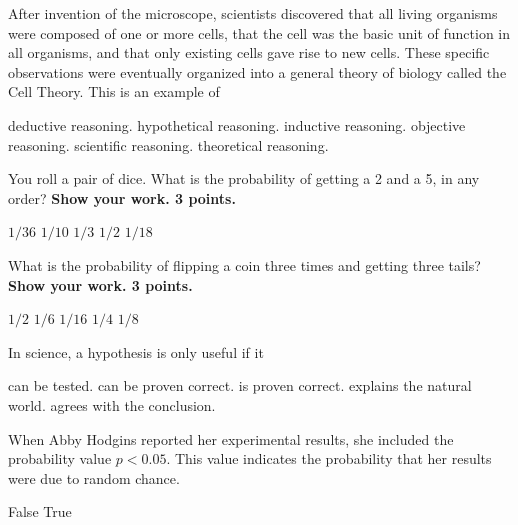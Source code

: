 \question
After invention of the microscope, scientists discovered that all living organisms were composed of one or more cells, that the cell was the basic unit of function in all organisms, and that only existing cells gave rise to new cells. These specific observations were eventually organized into a general theory of biology called the Cell Theory. This is an example of 

\begin{choices}
\choice deductive reasoning.%
\choice hypothetical reasoning.%
\correctchoice inductive reasoning.%
\choice objective reasoning.%
\choice scientific reasoning.%
\choice theoretical reasoning.%
\end{choices}

\question
You roll a pair of dice.  What is the probability of getting a 2 and a 5, in any order? \textbf{Show your work.  3 points.}

\begin{choices}
\choice $1/36$%
\choice $1/10$%
\choice $1/3$%
\choice $1/2$%
\choice $1/18$%
\end{choices}

\question
What is the probability of flipping a coin three times and getting three tails? \textbf{Show your work. 3 points.}

\begin{choices}
\choice $1/2$%
\choice $1/6$%
\choice $1/16$%
\choice $1/4$%
\choice $1/8$%
\end{choices}

\question
In science, a hypothesis is only useful if it

\begin{choices}
\choice can be tested.%
\choice can be proven correct.%
\choice is proven correct.%
\choice explains the natural world.%
\choice agrees with the conclusion.%
\end{choices}

\question
When Abby Hodgins reported her experimental results, she included the probability value  $p < 0.05$.  This value indicates the probability that her results were due to random chance.

\begin{choices}
\choice False%
\choice True%
\end{choices}

